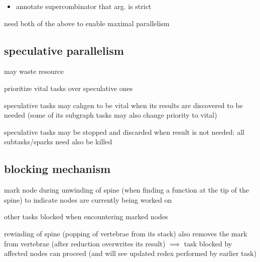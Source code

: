 \documentclass[8pt]{extarticle}
\begin{document}
\begin{multicols*}{2}
\begin{itemize}
\item annotate supercombinator that arg. is strict

  
\end{itemize}

need both of the above to enable maximal parallelism

\subsection{speculative parallelism}
may waste resource

prioritize vital tasks over speculative ones

speculative tasks may cahgen to be vital when its results are discovered to be needed (some of its subgraph tasks may also change priority to vital)

speculative tasks may be stopped and discarded when result is not needed: all subtasks/sparks  need also be killed

\subsection{blocking mechanism}

mark node during unwinding of spine (when finding a function at the tip of the spine) to indicate nodes are currently being worked on

other tasks blocked when encountering marked nodes

rewinding of spine (popping of vertebrae from its stack) also removes the mark from vertebrae (after reduction overwrites its result) $\implies$ task blocked by affected nodes can proceed (and will see updated redex performed by earlier task)



\end{multicols*}
\end{document}
